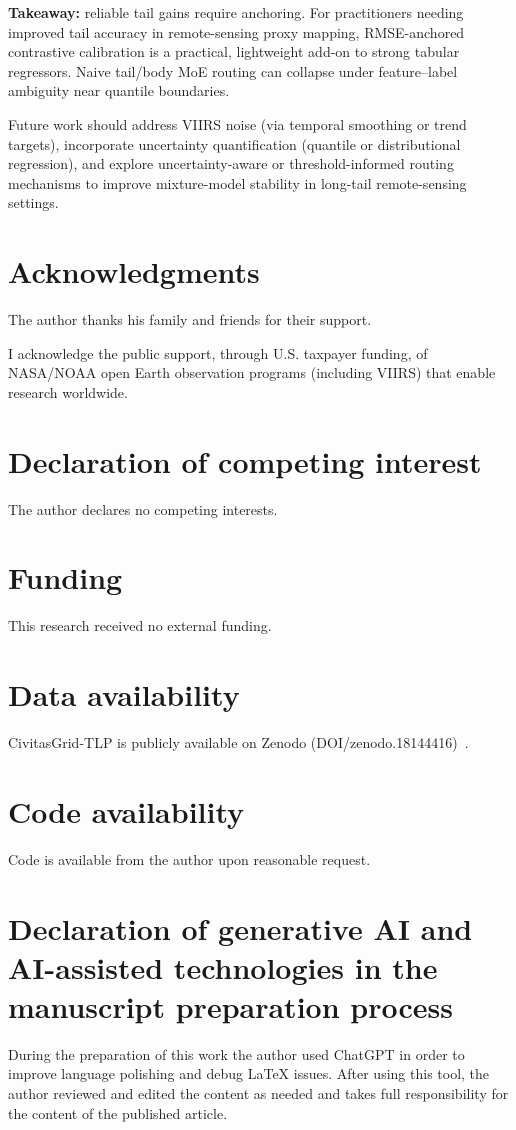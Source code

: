 \documentclass[preprint,12pt]{elsarticle}
\begin{document}
\textbf{Takeaway:} reliable tail gains require anchoring. For practitioners needing improved tail accuracy in remote-sensing proxy mapping, RMSE-anchored contrastive calibration is a practical, lightweight add-on to strong tabular regressors. Naive tail/body MoE routing can collapse under feature--label ambiguity near quantile boundaries.

Future work should address VIIRS noise (via temporal smoothing or trend targets), incorporate uncertainty quantification (quantile or distributional regression), and explore uncertainty-aware or threshold-informed routing mechanisms to improve mixture-model stability in long-tail remote-sensing settings.


\section*{Acknowledgments}

The author thanks his family and friends for their support.

I acknowledge the public support, through U.S. taxpayer funding, of NASA/NOAA open Earth observation programs (including VIIRS) that enable research worldwide.

\section*{Declaration of competing interest}
The author declares no competing interests.

\section*{Funding}
This research received no external funding.

\section*{Data availability}
CivitasGrid-TLP is publicly available on Zenodo (DOI/zenodo.18144416)~\cite{huang_2026_18144416}.

\section*{Code availability}
Code is available from the author upon reasonable request.

\section*{Declaration of generative AI and AI-assisted technologies in the manuscript preparation process}
During the preparation of this work the author used ChatGPT in order to improve language polishing and debug LaTeX issues. After using this tool, the author reviewed and edited the content as needed and takes full responsibility for the content of the published article.


\end{document}
